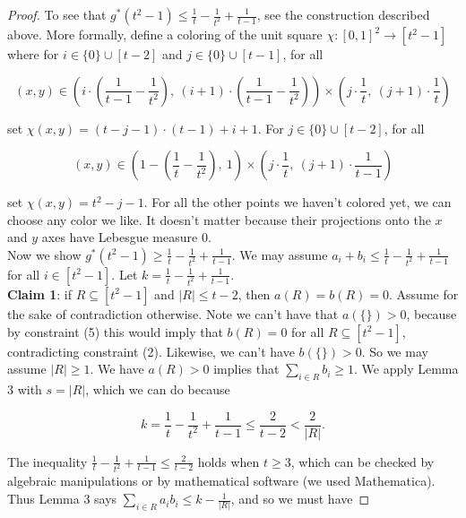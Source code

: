 \documentclass{article}
\begin{document}
\begin{proof}
To see that $g^*(t^2-1) \leq \frac{1}{t} - \frac{1}{t^2} + \frac{1}{t-1}$, see the construction described above. More formally, define a coloring of the unit square $\chi : [0,1]^2 \rightarrow [t^2-1]$ where for $i \in \{0\} \cup [t-2]$ and $j \in \{0\} \cup [t-1]$, for all 

$$(x,y) \in \left( i \cdot (\frac{1}{t-1} - \frac{1}{t^2}), \ (i+1) \cdot(\frac{1}{t-1} - \frac{1}{t^2}) \right) \times \left( j \cdot \frac{1}{t}, \ (j+1) \cdot \frac{1}{t} \right) $$

\noindent
set $\chi(x,y) = (t-j-1) \cdot (t-1) + i + 1$. For $j \in \{0\} \cup [t-2] $, for all 

$$(x,y) \in \left( 1- (\frac{1}{t}-\frac{1}{t^2}), \ 1 \right) \times \left( j \cdot \frac{1}{t}, \ (j+1) \cdot \frac{1}{t-1} \right) $$

\noindent 
set $\chi(x,y) = t^2 - j - 1$. For all the other points we haven't colored yet, we can choose any color we like. It doesn't matter because their projections onto the $x$ and $y$ axes have Lebesgue measure $0$.  \\

Now we show $g^*(t^2-1) \geq \frac{1}{t} - \frac{1}{t^2} + \frac{1}{t-1}$. We may assume $a_i+b_i \leq \frac{1}{t}-\frac{1}{t^2} + \frac{1}{t-1}$ for all $i \in [t^2-1]$. Let $k = \frac{1}{t} - \frac{1}{t^2} + \frac{1}{t-1}$. \\

\textbf{Claim 1}: if $R \subseteq [t^2-1]$ and $|R| \leq t-2$, then $a(R) = b(R) = 0$. Assume for the sake of contradiction otherwise. Note we can't have that $a(\{\}) > 0$, because by constraint (5) this would imply that $b(R) = 0$ for all $R \subseteq [t^2-1]$, contradicting constraint (2). Likewise, we can't have $b(\{\}) > 0$. So we may assume $|R| \geq 1$. We have $a(R) > 0$ implies that $\sum_{i \in R} b_i \geq 1$. We apply Lemma 3 with $s = |R|$, which we can do because 

$$k = \frac{1}{t} - \frac{1}{t^2} + \frac{1}{t-1} \leq \frac{2}{t-2} < \frac{2}{|R|}.$$

\noindent
The inequality $\frac{1}{t} - \frac{1}{t^2} + \frac{1}{t-1} \leq \frac{2}{t-2}$ holds when $t \geq 3$, which can be checked by algebraic manipulations or by mathematical software (we used Mathematica). \\

Thus Lemma 3 says $\sum_{i \in R} a_ib_i \leq k - \frac{1}{|R|}$, and so we must have 


\end{proof}
\end{document}
